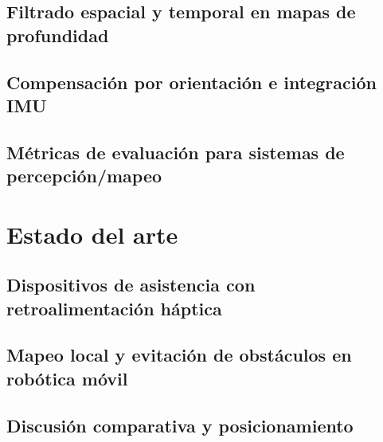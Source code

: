 \section{Filtrado espacial y temporal en mapas de profundidad}

\section{Compensación por orientación e integración IMU}

\section{Métricas de evaluación para sistemas de percepción/mapeo}

\chapter{Estado del arte}

\section{Dispositivos de asistencia con retroalimentación háptica}

\section{Mapeo local y evitación de obstáculos en robótica móvil}

\section{Discusión comparativa y posicionamiento}

